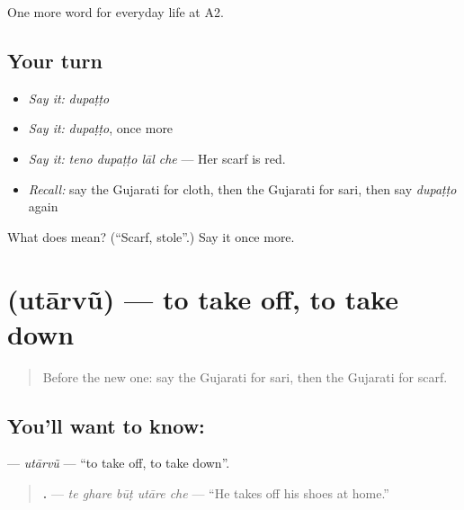 \begin{grammarlens}[title={What you've built}]
One more word for everyday life at A2.
\end{grammarlens}

\subsection*{Your turn}
\begin{itemize}
\raggedright
  \item \emph{Say it:} \emph{dupaṭṭo}
  \item \emph{Say it:} \emph{dupaṭṭo}, once more
  \item \emph{Say it:} \emph{teno dupaṭṭo lāl che} — Her scarf is red.
  \item \emph{Recall:} say the Gujarati for cloth, then the Gujarati for sari, then say \emph{dupaṭṭo} again
\end{itemize}

\begin{tcolorbox}[breakable,colback=teal!4,colframe=teal!35!black,title={Before you move on}]
What does  mean? (\textquotedblleft{}Scarf, stole\textquotedblright{}.) Say it once more.
\end{tcolorbox}
\section[\texorpdfstring{\gu{ઉતારવું} (utārvũ)}{ઉતારવું (utārvũ)}]{ (utārvũ) — to take off, to take down}

\label{lesson:GU-C154-utarvu}



\begin{quote}
Before the new one: say the Gujarati for sari, then the Gujarati for scarf.
\end{quote}

\subsection*{You'll want to know: }
\textbf{} — \emph{utārvũ} — \textquotedblleft{}to take off, to take down\textquotedblright{}.

\begin{quote}
\textbf{    .} — \emph{te ghare būṭ utāre che} — \textquotedblleft{}He takes off his shoes at home.\textquotedblright{}
\end{quote}

